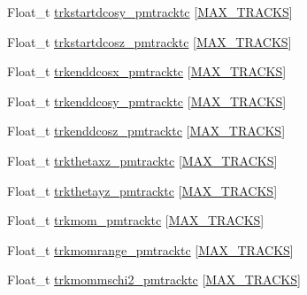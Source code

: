 \begin{DoxyCompactItemize}
\item 
Float\-\_\-t \hyperlink{classanatree_af63bd0dbe683b30ccf1882e5fda858f0}{trkstartdcosy\-\_\-pmtracktc} \mbox{[}\hyperlink{anatree__core__v09410002__orig_8h_a327fd4e796e4a0d78947524c96e4362e}{M\-A\-X\-\_\-\-T\-R\-A\-C\-K\-S}\mbox{]}
\item 
Float\-\_\-t \hyperlink{classanatree_a6b97cf78b767eed767cb559aec37e65c}{trkstartdcosz\-\_\-pmtracktc} \mbox{[}\hyperlink{anatree__core__v09410002__orig_8h_a327fd4e796e4a0d78947524c96e4362e}{M\-A\-X\-\_\-\-T\-R\-A\-C\-K\-S}\mbox{]}
\item 
Float\-\_\-t \hyperlink{classanatree_a7066a3aeab48d8c18b61cefebb0180f5}{trkenddcosx\-\_\-pmtracktc} \mbox{[}\hyperlink{anatree__core__v09410002__orig_8h_a327fd4e796e4a0d78947524c96e4362e}{M\-A\-X\-\_\-\-T\-R\-A\-C\-K\-S}\mbox{]}
\item 
Float\-\_\-t \hyperlink{classanatree_a674ba281b17125d64e8cdbfb9b184dfc}{trkenddcosy\-\_\-pmtracktc} \mbox{[}\hyperlink{anatree__core__v09410002__orig_8h_a327fd4e796e4a0d78947524c96e4362e}{M\-A\-X\-\_\-\-T\-R\-A\-C\-K\-S}\mbox{]}
\item 
Float\-\_\-t \hyperlink{classanatree_abadcd4b5472c86ce857cb3813afab6be}{trkenddcosz\-\_\-pmtracktc} \mbox{[}\hyperlink{anatree__core__v09410002__orig_8h_a327fd4e796e4a0d78947524c96e4362e}{M\-A\-X\-\_\-\-T\-R\-A\-C\-K\-S}\mbox{]}
\item 
Float\-\_\-t \hyperlink{classanatree_aec0692e36120ad9fb508a85e2044e03d}{trkthetaxz\-\_\-pmtracktc} \mbox{[}\hyperlink{anatree__core__v09410002__orig_8h_a327fd4e796e4a0d78947524c96e4362e}{M\-A\-X\-\_\-\-T\-R\-A\-C\-K\-S}\mbox{]}
\item 
Float\-\_\-t \hyperlink{classanatree_a85bee7d326090b7394d5eead814a4229}{trkthetayz\-\_\-pmtracktc} \mbox{[}\hyperlink{anatree__core__v09410002__orig_8h_a327fd4e796e4a0d78947524c96e4362e}{M\-A\-X\-\_\-\-T\-R\-A\-C\-K\-S}\mbox{]}
\item 
Float\-\_\-t \hyperlink{classanatree_a33b7628b822ea1025e2a2972469e4a37}{trkmom\-\_\-pmtracktc} \mbox{[}\hyperlink{anatree__core__v09410002__orig_8h_a327fd4e796e4a0d78947524c96e4362e}{M\-A\-X\-\_\-\-T\-R\-A\-C\-K\-S}\mbox{]}
\item 
Float\-\_\-t \hyperlink{classanatree_a8176079e5232f7cd94c2801faaa29bc3}{trkmomrange\-\_\-pmtracktc} \mbox{[}\hyperlink{anatree__core__v09410002__orig_8h_a327fd4e796e4a0d78947524c96e4362e}{M\-A\-X\-\_\-\-T\-R\-A\-C\-K\-S}\mbox{]}
\item 
Float\-\_\-t \hyperlink{classanatree_a2bf0b888291307a4f5884e22a38dc28f}{trkmommschi2\-\_\-pmtracktc} \mbox{[}\hyperlink{anatree__core__v09410002__orig_8h_a327fd4e796e4a0d78947524c96e4362e}{M\-A\-X\-\_\-\-T\-R\-A\-C\-K\-S}\mbox{]}

\end{DoxyCompactItemize}
